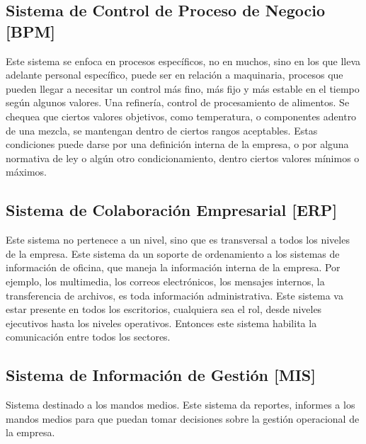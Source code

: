 \hypertarget{sistema-de-control-de-proceso-de-negocio-bpm}{%
\subsection{Sistema de Control de Proceso de Negocio
{[}BPM{]}}\label{sistema-de-control-de-proceso-de-negocio-bpm}}

Este sistema se enfoca en procesos específicos, no en muchos, sino en
los que lleva adelante personal específico, puede ser en relación a
maquinaria, procesos que pueden llegar a necesitar un control más fino,
más fijo y más estable en el tiempo según algunos valores. Una
refinería, control de procesamiento de alimentos. Se chequea que ciertos
valores objetivos, como temperatura, o componentes adentro de una
mezcla, se mantengan dentro de ciertos rangos aceptables. Estas
condiciones puede darse por una definición interna de la empresa, o por
alguna normativa de ley o algún otro condicionamiento, dentro ciertos
valores mínimos o máximos.

\hypertarget{sistema-de-colaboraciuxf3n-empresarial-erp}{%
\subsection{Sistema de Colaboración Empresarial
{[}ERP{]}}\label{sistema-de-colaboraciuxf3n-empresarial-erp}}

Este sistema no pertenece a un nivel, sino que es transversal a todos
los niveles de la empresa. Este sistema da un soporte de ordenamiento a
los sistemas de información de oficina, que maneja la información
interna de la empresa. Por ejemplo, los multimedia, los correos
electrónicos, los mensajes internos, la transferencia de archivos, es
toda información administrativa. Este sistema va estar presente en todos
los escritorios, cualquiera sea el rol, desde niveles ejecutivos hasta
los niveles operativos. Entonces este sistema habilita la comunicación
entre todos los sectores.

\hypertarget{sistema-de-informaciuxf3n-de-gestiuxf3n-mis}{%
\subsection{Sistema de Información de Gestión
{[}MIS{]}}\label{sistema-de-informaciuxf3n-de-gestiuxf3n-mis}}

Sistema destinado a los mandos medios. Este sistema da reportes,
informes a los mandos medios para que puedan tomar decisiones sobre la
gestión operacional de la empresa.

